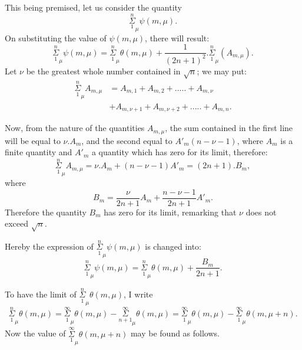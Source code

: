 \documentclass{article}
\begin{document}
This being premised, let us consider the quantity
\[ \overset{n}{\underset{1}{\Sigma}}_{\mu}\psi(m,\mu). \]
On substituting the value of $\psi(m,\mu)$, there will result:
\[ \overset{n}{\underset{1}{\Sigma}}_{\mu}\psi(m,\mu)=\overset{n}{\underset{1}{\Sigma}}_{\mu}\theta(m,\mu)+\frac{1}{(2n+1)^{2}}.\overset{n}{\underset{1}{\Sigma}}_{\mu}(A_{m,\mu}). \tag{168.} \]
Let $\nu$ be the greatest whole number contained in $\sqrt{n}$; we may put:
\[ \begin{aligned}\overset{n}{\underset{1}{\Sigma}}_{\mu}A_{m,\mu}&=A_{m,1}+A_{m,2}+.....+A_{m,\nu}\\ &+A_{m,\nu+1}+A_{m,\nu+2}+.....+A_{m,n}.\end{aligned} \]

Now, from the nature of the quantities $A_{m,\mu}$, the sum contained in the first line will be equal to $\nu.A_{m}$, and the second equal to $A'_{m}(n-\nu-1)$, where $A_{m}$ is a finite quantity and $A'_{m}$ a quantity which has zero for its limit, therefore:
\[ \overset{n}{\underset{1}{\Sigma}}_{\mu}A_{m,\mu}=\nu.A_{m}+(n-\nu-1)A'_{m}=(2n+1).B_{m}, \]
where
\[ B_{m}=\frac{\nu}{2n+1}A_{m}+\frac{n-\nu-1}{2n+1}A'_{m}. \]
Therefore the quantity $B_{m}$ has zero for its limit, remarking that $\nu$ does not exceed $\sqrt{n}$.

Hereby the expression of $\overset{n}{\underset{1}{\Sigma}}_{\mu}\psi(m,\mu)$ is changed into:
\[ \overset{n}{\underset{1}{\Sigma}}_{\mu}\psi(m,\mu)=\overset{n}{\underset{1}{\Sigma}}_{\mu}\theta(m,\mu)+\frac{B_{m}}{2n+1}. \tag{169.} \]

To have the limit of $\overset{n}{\underset{1}{\Sigma}}_{\mu}\theta(m,\mu)$, I write
\[ \overset{n}{\underset{1}{\Sigma}}_{\mu}\theta(m,\mu)=\overset{\infty}{\underset{1}{\Sigma}}_{\mu}\theta(m,\mu)-\overset{\infty}{\underset{n+1}{\Sigma}}_{\mu}\theta(m,\mu)=\overset{\infty}{\underset{1}{\Sigma}}_{\mu}\theta(m,\mu)-\overset{\infty}{\underset{1}{\Sigma}}_{\mu}\theta(m,\mu+n). \]
Now the value of $\overset{\infty}{\underset{1}{\Sigma}}_{\mu}\theta(m,\mu+n)$ may be found as follows.

\end{document}
